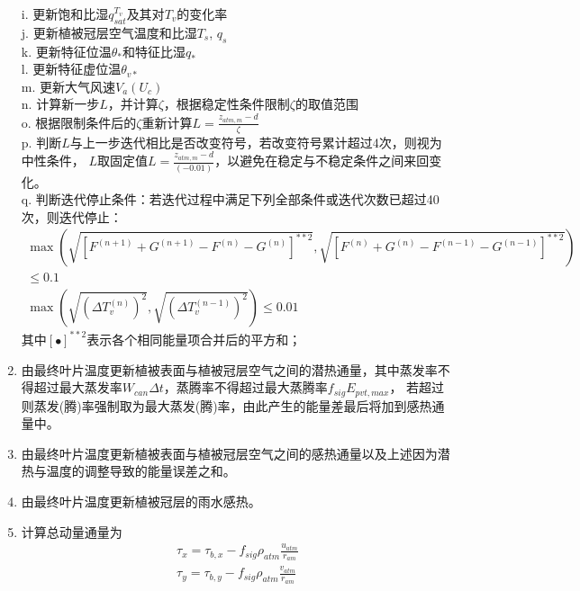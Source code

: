 \begin{enumerate}
    i. 更新饱和比湿$q_{sat}^{T_v}$及其对$T_v$的变化率 \\
    j. 更新植被冠层空气温度和比湿$T_s$, $q_s$ \\ 
    k. 更新特征位温$\theta_\ast$和特征比湿$q_\ast$ \\
    l. 更新特征虚位温$\theta_{v\ast}$ \\
    m. 更新大气风速$V_a\left(U_c\right)$ \\
    n. 计算新一步$L$，并计算$\zeta$，根据稳定性条件限制$\zeta$的取值范围 \\
    o. 根据限制条件后的$\zeta$重新计算$L=\frac{z_{atm,m}-d}{\zeta}$ \\
    p. 判断$L$与上一步迭代相比是否改变符号，若改变符号累计超过4次，则视为中性条件，
    $L$取固定值$L=\frac{z_{atm,m}-d}{\left(-0.01\right)}$，以避免在稳定与不稳定条件之间来回变化。\\
    q. 判断迭代停止条件：若迭代过程中满足下列全部条件或迭代次数已超过40次，则迭代停止：
    \begin{equation}
        \begin{array}{c}\max\left( \sqrt{\left[F^{(n+1)}+G^{(n+1)}-F^{(n)}-G^{(n)}\right]^{\ast\ast2}}, \sqrt{\left[F^{(n)}+G^{(n)}-F^{(n-1)}-G^{(n-1)}\right]^{\ast\ast2}} \right) \\ \leq 0.1 \\ 
        \max\left( \sqrt{\left(\Delta T_{v}^{(n)}\right)^{2}}, \sqrt{\left(\Delta T_{v}^{(n-1)}\right)^{2}} \right) \leq 0.01\end{array}
    \end{equation}
    其中$\left[\bullet\right]^{\ast\ast2}$表示各个相同能量项合并后的平方和；
    \item 由最终叶片温度更新植被表面与植被冠层空气之间的潜热通量，其中蒸发率不得超过最大蒸发率$W_{can} \Delta t$，蒸腾率不得超过最大蒸腾率$f_{sig} E_{pvt,max}$，
    若超过则蒸发(腾)率强制取为最大蒸发(腾)率，由此产生的能量差最后将加到感热通量中。
    \item 由最终叶片温度更新植被表面与植被冠层空气之间的感热通量以及上述因为潜热与温度的调整导致的能量误差之和。
    \item 由最终叶片温度更新植被冠层的雨水感热。
    \item 计算总动量通量为
    \begin{equation}
    \begin{array}{c}\tau_{x}=\tau_{b,x}-f_{sig} \rho_{atm} \frac{u_{atm}}{r_{a m}} \\ 
        \tau_{y}=\tau_{b,y}-f_{sig} \rho_{atm} \frac{v_{atm}}{r_{am}}\end{array}

\end{equation}
\end{enumerate}
